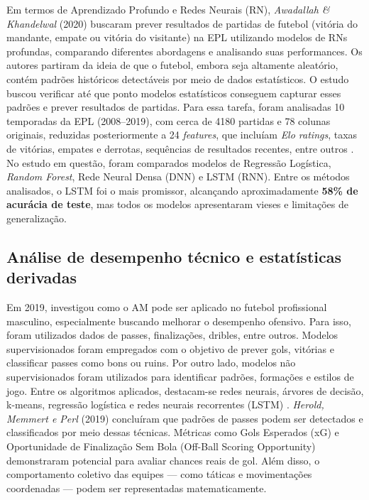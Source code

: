 Em termos de Aprendizado Profundo e Redes Neurais (RN), \textit{Awadallah \& Khandelwal} (2020) buscaram prever resultados de partidas de futebol (vitória do mandante, 
empate ou vitória do visitante) na EPL utilizando modelos de RNs profundas, comparando diferentes abordagens e analisando suas performances. 
Os autores partiram da ideia de que o futebol, embora seja altamente aleatório, contém padrões históricos detectáveis por meio de dados estatísticos. 
O estudo buscou verificar até que ponto modelos estatísticos conseguem capturar esses padrões e prever resultados de partidas.
Para essa tarefa, foram analisadas 10 temporadas da EPL (2008–2019), com cerca de 4180 partidas e 78 colunas originais, reduzidas posteriormente a 24 \textit{features}, 
que incluíam \textit{Elo ratings}, taxas de vitórias, empates e derrotas, sequências de resultados recentes, entre outros \cite{awadallah2020}.
No estudo em questão, foram comparados modelos de Regressão Logística, \textit{Random Forest}, Rede Neural Densa (DNN) e LSTM (RNN). Entre os métodos analisados, 
o LSTM foi o mais promissor, alcançando aproximadamente \textbf{58\% de acurácia de teste}, mas todos os modelos apresentaram vieses e limitações de generalização.

\subsection{Análise de desempenho técnico e estatísticas derivadas}

Em 2019, \cite{Herold2019} investigou como o AM pode ser aplicado no futebol profissional masculino, especialmente buscando melhorar o desempenho ofensivo. 
Para isso, foram utilizados dados de passes, finalizações, dribles, entre outros.
Modelos supervisionados foram empregados com o objetivo de prever gols, vitórias e classificar passes como bons ou ruins. Por outro lado, 
modelos não supervisionados foram utilizados para identificar padrões, formações e estilos de jogo. Entre os algoritmos aplicados, destacam-se redes neurais, 
árvores de decisão, k-means, regressão logística e redes neurais recorrentes (LSTM) \cite{Herold2019}.
\textit{Herold, Memmert e Perl} (2019) concluíram que padrões de passes podem ser detectados e classificados por meio dessas técnicas. 
Métricas como Gols Esperados (xG) e Oportunidade de Finalização Sem Bola (Off-Ball Scoring Opportunity) demonstraram potencial para avaliar chances reais de gol. 
Além disso, o comportamento coletivo das equipes — como táticas e movimentações coordenadas — podem ser representadas matematicamente.

